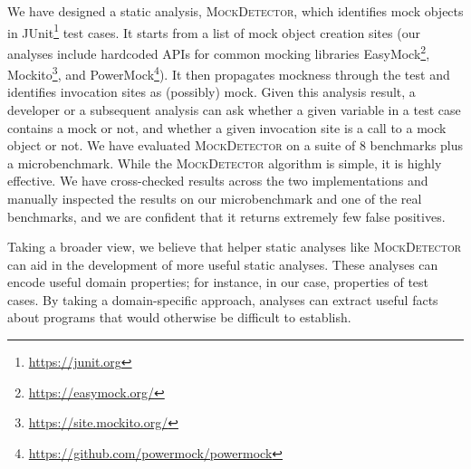 We have designed a static analysis, \textsc{MockDetector}, which identifies
mock objects in JUnit\footnote{\url{https://junit.org}} test cases. It starts from a list of mock object creation sites
(our analyses include hardcoded APIs for common mocking libraries EasyMock\footnote{\url{https://easymock.org/}}, Mockito\footnote{\url{https://site.mockito.org/}}, and PowerMock\footnote{\url{https://github.com/powermock/powermock}}). 
It then propagates mockness
through the test and identifies invocation sites as (possibly) mock.
Given this analysis result, a developer or a subsequent analysis
can ask whether a given variable in a test case contains a mock or not, and
whether a given invocation site is a call to a mock object or not. We have
evaluated \textsc{MockDetector} on a suite of 8 benchmarks plus a microbenchmark. 
While the \textsc{MockDetector} algorithm is simple, it is highly effective.
We have cross-checked results across the two implementations and manually inspected
the results on our microbenchmark and one of the real benchmarks, and we are 
confident that it returns extremely few false positives.

Taking a broader view, we believe that helper static analyses like \textsc{MockDetector} 
can aid
in the development of more useful static analyses. These analyses can
encode useful domain properties; for instance, in our case, properties
of test cases. By taking a domain-specific approach, analyses can extract
useful facts about programs that would otherwise be difficult to establish.

